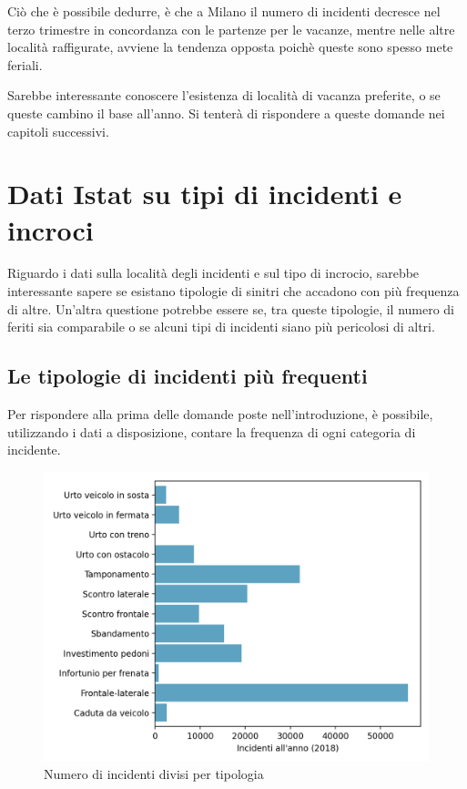\documentclass[a4paper,12pt]{report}
\begin{document}
Ciò che è possibile dedurre, è che a Milano il numero di incidenti decresce 
nel terzo trimestre in concordanza con le partenze per le vacanze, mentre nelle 
altre località raffigurate, avviene la tendenza opposta poichè 
queste sono spesso mete feriali.

Sarebbe interessante conoscere l'esistenza di località di vacanza preferite, 
o se queste cambino il base all'anno. 
Si tenterà di rispondere a queste domande nei capitoli successivi.

\section{Dati Istat su tipi di incidenti e incroci}

Riguardo i dati sulla località degli incidenti e sul tipo di incrocio, 
sarebbe interessante sapere se esistano tipologie di sinitri che accadono 
con più frequenza di altre. 
Un'altra questione potrebbe essere se, tra queste tipologie, il numero di feriti 
sia comparabile o se alcuni tipi di incidenti siano più pericolosi di altri.

\subsection{Le tipologie di incidenti più frequenti}

Per rispondere alla prima delle domande poste nell'introduzione, è possibile, 
utilizzando i dati a disposizione, contare la frequenza di ogni categoria di incidente.

\begin{figure}
    \hfill\includegraphics[width=0.7\linewidth]{../src/incidenti/incidenti_senza_coords/localizzazione_incidente/tipo_incidente.png}\hspace*{\fill}
    \caption{Numero di incidenti divisi per tipologia}
    \label{fig:tipo-incidente}
\end{figure}
\end{document}

